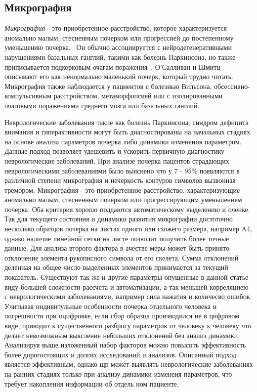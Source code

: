 \subsection{Микрография}
\emph{Микрография} - это приобретенное расстройство, которое характеризуется аномально малым, стесненным почерком или прогрессией до постепенному уменьшению почерка.~\cite{larner_dict_neuro} Он обычно ассоциируется с нейродегенеративными нарушениями базальных ганглий, такими как болезнь Паркинсона, но также приписывается подкорковым очагам поражения~\cite{academic_press_movement_disorders}. О'Салливан и Шмитц описывают его как ненормально маленький почерк, который трудно читать.~\cite{o_sullivan} Микрография также наблюдается у пациентов с болезнью Вильсона, обсессивно-компульсивным расстройством, метаморфопсией или с изолированными очаговыми поражениями среднего мозга или базальных ганглий.~\cite{kinematic_hardwrittung_analysis}

Неврологические заболевания такие как болезнь Паркинсона, синдром дефицита внимания и гиперактивности могут быть диагностированы на начальных стадиях на основе анализа параметров почерка либо динамики изменения параметром. Данные подход позволяет удешевить и ускорить первичную диагностику неврологические заболеваний.
При анализе почерка пацентов страдающих неврологическими заболеваниями было выяснено что у 7 - 95\% появляются в различной степени микрография и нечеркость контуров символов вызвонная тремором. Микрография - это приобретенное расстройство, характеризующие аномально малым, стесненным почерком или прогрессирующим уменьшением почерка.
Оба критерия хорошо поддаются автоматическому выделению и оченке. Так для текущего состояния и динамики развития микрографии достоточно несколько образцов почерка на листах одного или схожего размера, например A4, однако наличие линейной сетки на листе позволит получить более точные данные.
Для анализа второго фактора в ачестве меры может быть принято отклонение элемента рукописного символа от его скелета. Сумма отклонений деленная на общее число выделенных элементов принимается за текущий показатель.
Существуют так же и другие параметры опущенные в данной статье виду большей сложности рассчета и автоматизации, а так меньшей корреляциею с неврологическими заболеваниями, например сила нажатия и количесво ошибок.
Учитывая индивитульные особенности почерка отдельного человека и погрешности при оцифровке, если сбор образца производился не в цифровом виде, приводит к существенного разбросу параметров от человеку к человеку что делает невозможным выясление небольших отклонений без анализ динамики.   
Анализируя выше изложенный набор факторов можно повысить эффективность более дорогостоящих и долгих исследований и анализов.
Описанный подход является эффективным, однако щр может выявлять неврологические заболеваниях на ранних стадиях только при анализу динамики изменеия параметров, что требует накопления информации об отдель ном пациенте.


